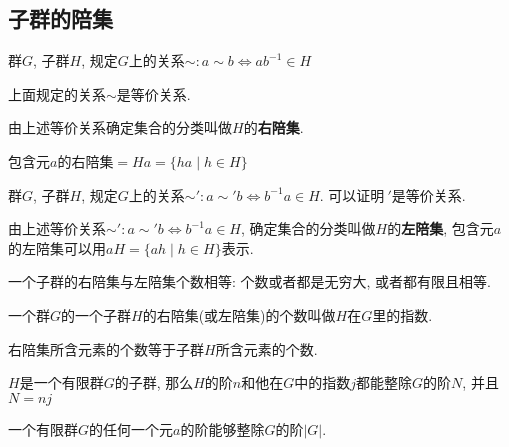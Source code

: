\subsection{子群的陪集}

\begin{Definition}
群$G$, 子群$H$, 规定$G$上的关系$\sim: a \sim b \Leftrightarrow a b^{-1} \in H$
\end{Definition}

\begin{Theorem}
上面规定的关系$\sim$是等价关系.
\end{Theorem}

\begin{Definition}[右陪集]
由上述等价关系确定集合的分类叫做$H$的\textbf{右陪集}.
\end{Definition}

\begin{Theorem}
包含元$a$的右陪集$ = Ha =  \{ ha \mid h \in H \}$
\end{Theorem}

\begin{Definition}
群$G$, 子群$H$, 规定$G$上的关系$\sim': a \sim 'b \Leftrightarrow b^{-1} a \in H$. 可以证明$~'$是等价关系.
\end{Definition}

\begin{Definition}[左陪集]
由上述等价关系$\sim': a \sim' b \Leftrightarrow b^{-1} a \in H$, 确定集合的分类叫做$H$的\textbf{左陪集}, 包含元$a$的左陪集可以用$aH = \{ ah \mid h \in H \}$表示.
\end{Definition}

\begin{Theorem}
一个子群的右陪集与左陪集个数相等: 个数或者都是无穷大, 或者都有限且相等.
\end{Theorem}

\begin{Definition}[指数]
一个群$G$的一个子群$H$的右陪集(或左陪集)的个数叫做$H$在$G$里的指数.
\end{Definition}

\begin{Theorem}
右陪集所含元素的个数等于子群$H$所含元素的个数.
\end{Theorem}

\begin{Theorem}
$H$是一个有限群$G$的子群, 那么$H$的阶$n$和他在$G$中的指数$j$都能整除$G$的阶$N$, 并且$N = nj$
\end{Theorem}

\begin{Theorem}[元素的阶整除群的阶]
一个有限群$G$的任何一个元$a$的阶能够整除$G$的阶$|G|$.
\end{Theorem}

